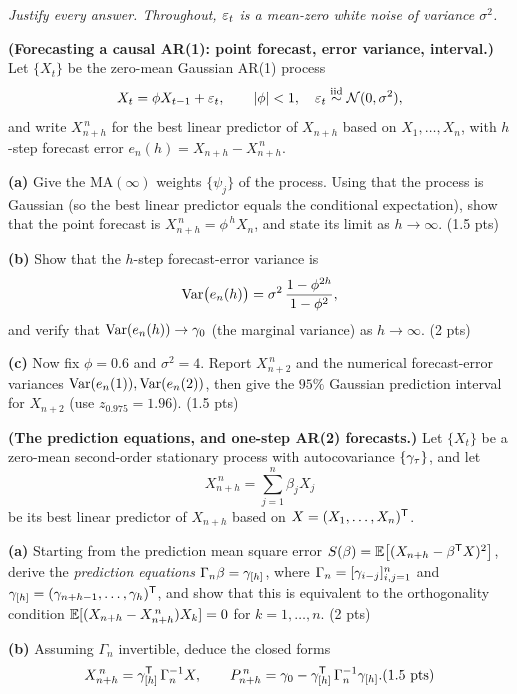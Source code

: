 \documentclass[11pt]{article}
\begin{document}
\pointstable
\begin{center}\itshape Justify every answer. Throughout, $\varepsilon_t$ is a mean-zero white noise of variance $\sigma^2$.\end{center}

\textbf{(Forecasting a causal AR(1): point forecast, error variance, interval.)}
Let $\{X_t\}$ be the zero-mean Gaussian AR(1) process
\[
X_t=\phi X_{t-1}+\varepsilon_t,\qquad \left\lvert \phi \right\rvert<1,\quad \varepsilon_t\overset{\text{iid}}{\sim}\mathcal N(0,\sigma^2),
\]
and write $X^{\,n}_{n+h}$ for the best linear predictor of $X_{n+h}$ based on
$X_1,\dots,X_n$, with $h$-step forecast error $e_n(h)=X_{n+h}-X^{\,n}_{n+h}$.

\textbf{(a)} Give the $\mathrm{MA}(\infty)$ weights $\{\psi_j\}$ of the process. Using that the process is Gaussian (so the best linear predictor equals the conditional expectation), show that the point forecast is $X^{\,n}_{n+h}=\phi^{\,h}X_n$, and state its limit as $h\to\infty$. \hfill(1.5 pts)

\textbf{(b)} Show that the $h$-step forecast-error variance is
\[
\operatorname{Var}\bigl(e_n(h)\bigr)=\sigma^2\,\frac{1-\phi^{2h}}{1-\phi^2},
\]
and verify that $\operatorname{Var}(e_n(h))\to\gamma_0$ (the marginal variance) as $h\to\infty$. \hfill(2 pts)

\textbf{(c)} Now fix $\phi=0.6$ and $\sigma^2=4$. Report $X^{\,n}_{n+2}$ and the numerical forecast-error variances $\operatorname{Var}(e_n(1)),\operatorname{Var}(e_n(2))$, then give the $95\%$ Gaussian prediction interval for $X_{n+2}$ (use $z_{0.975}=1.96$). \hfill(1.5 pts)
\answerpage

\textbf{(The prediction equations, and one-step AR(2) forecasts.)} Let $\{X_t\}$ be a zero-mean second-order stationary process with autocovariance $\{\gamma_\tau\}$, and let
\[
X^{\,n}_{n+h}=\sum_{j=1}^{n}\beta_j X_j
\]
be its best linear predictor of $X_{n+h}$ based on $X=(X_1,\dots,X_n)^{\mathsf{T}}$.

\textbf{(a)} Starting from the prediction mean square error $S(\beta)=\mathbb{E}\bigl[(X_{n+h}-\beta^{\mathsf{T}} X)^2\bigr]$, derive the \emph{prediction equations} $\Gamma_n\beta=\gamma_{[h]}$, where $\Gamma_n=[\gamma_{i-j}]_{i,j=1}^n$ and $\gamma_{[h]}=(\gamma_{n+h-1},\dots,\gamma_h)^{\mathsf{T}}$, and show that this is equivalent to the orthogonality condition $\mathbb{E}[(X_{n+h}-X^{\,n}_{n+h})X_k]=0$ for $k=1,\dots,n$. \hfill(2 pts)

\textbf{(b)} Assuming $\Gamma_n$ invertible, deduce the closed forms
\[
X^{\,n}_{n+h}=\acvs_{[h]}\Tr\,\Gamma_n^{-1}X,
\qquad
P^{\,n}_{n+h}=\acvs_0-\acvs_{[h]}\Tr\,\Gamma_n^{-1}\acvs_{[h]} . \hfill(1.5\text{ pts})
\]
\end{document}
